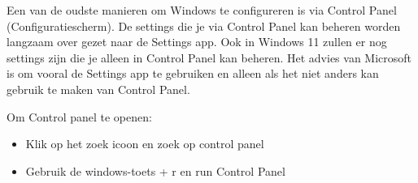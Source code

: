 Een van de oudste manieren om Windows te configureren is via Control Panel (Configuratiescherm). De settings die je via Control Panel kan beheren worden langzaam over gezet naar de Settings app. Ook in Windows 11 zullen er nog settings zijn die je alleen in Control Panel kan beheren. Het advies van Microsoft is om vooral de Settings app te gebruiken en alleen als het niet anders kan gebruik te maken van Control Panel.

Om Control panel te openen:
\begin{itemize}
\item Klik op het zoek icoon en zoek op control panel
\item Gebruik de windows-toets + r en run Control Panel
\end{itemize}

\begin{minipage}[t]{\linewidth}
\raggedright
{}
\end{minipage}

